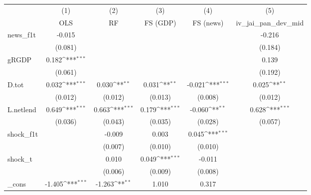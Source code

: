 {
\def\sym#1{\ifmmode^{#1}\else\(^{#1}\)\fi}
\begin{tabular}{l*{5}{c}}
\toprule
            &\multicolumn{1}{c}{(1)}&\multicolumn{1}{c}{(2)}&\multicolumn{1}{c}{(3)}&\multicolumn{1}{c}{(4)}&\multicolumn{1}{c}{(5)}\\
            &\multicolumn{1}{c}{OLS}&\multicolumn{1}{c}{RF}&\multicolumn{1}{c}{FS (GDP)}&\multicolumn{1}{c}{FS (news)}&\multicolumn{1}{c}{iv\_jai\_pan\_dev\_mid}\\
\midrule
news\_f1t    &      -0.015         &                     &                     &                     &      -0.216         \\
            &     (0.081)         &                     &                     &                     &     (0.184)         \\
\addlinespace
gRGDP       &       0.182\sym{***}&                     &                     &                     &       0.139         \\
            &     (0.061)         &                     &                     &                     &     (0.192)         \\
\addlinespace
D.tot       &       0.032\sym{***}&       0.030\sym{**} &       0.031\sym{**} &      -0.021\sym{***}&       0.025\sym{**} \\
            &     (0.012)         &     (0.012)         &     (0.013)         &     (0.008)         &     (0.012)         \\
\addlinespace
L.netlend   &       0.649\sym{***}&       0.663\sym{***}&       0.179\sym{***}&      -0.060\sym{**} &       0.628\sym{***}\\
            &     (0.036)         &     (0.043)         &     (0.035)         &     (0.028)         &     (0.057)         \\
\addlinespace
shock\_f1t   &                     &      -0.009         &       0.003         &       0.045\sym{***}&                     \\
            &                     &     (0.007)         &     (0.010)         &     (0.010)         &                     \\
\addlinespace
shock\_t     &                     &       0.010         &       0.049\sym{***}&      -0.011         &                     \\
            &                     &     (0.006)         &     (0.009)         &     (0.008)         &                     \\
\addlinespace
\_cons      &      -1.405\sym{***}&      -1.263\sym{**} &       1.010         &       0.317         &                     \\

\end{tabular}}
